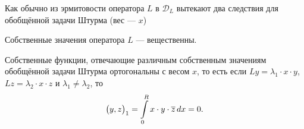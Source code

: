 \documentclass[12pt,a4paper,openany,fleqn]{book}
\newcommand{\mc}[1]{\ensuremath{\mathcal{#1}}}
\theoremstyle{definition}
\begin{document}
	Как обычно из эрмитовости оператора $L$ в $\mc{D}_L$ вытекают два следствия для обобщённой задачи Штурма (вес --- $x$) 
	\begin{enumerateD}
		\item Собственные значения оператора $L$ --- вещественны.
		\item Собственные функции, отвечающие различным собственным значениям обобщённой задачи Штурма ортогональны с весом $x$, то есть если $Ly=\lambda_1\cdot x\cdot y$, $Lz=\lambda_2\cdot x\cdot z$ и $\lambda_1\neq\lambda_2$, то 
		\begin{equation*}
			\hfill\big(y,z\big)_1=\int\limits_0^R x\cdot y\cdot\overline{z}\,dx=0.\hfill
		\end{equation*}
	\end{enumerateD} 
\end{document}
